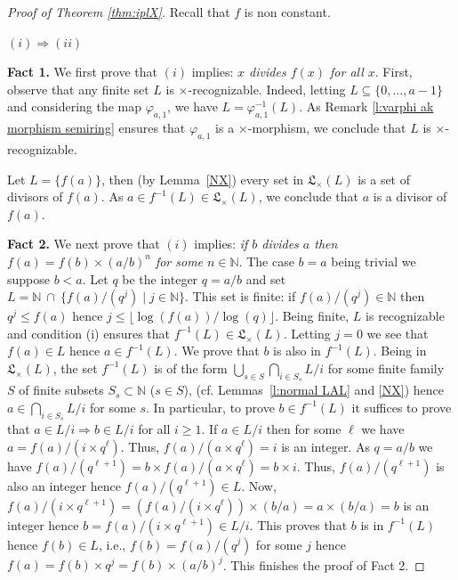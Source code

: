 \documentclass[11pt,a4paper]{article}
\theoremstyle{definition} %
\newcommand\+[1]{\mathcal{#1}} %
\newcommand{\N}{{\mathbb N}}     %
\newcommand{\Latt}{{\mathfrak{L}}}
\begin{document}
%
\begin{proof} [Proof of Theorem \ref{thm:iplX}] Recall that  $f$ is non constant.

$(i)\Longrightarrow (ii)$ 

{\bf Fact 1.} We first prove that $(i)$ implies:  {\em $x$ divides $f(x)$ for all $x$}.  
First, observe that any finite set $L$ is $\times$-recognizable.
Indeed, letting $L\subseteq\{0,\ldots,a-1\}$ and considering the map $\varphi_{a,1}$,
we have $L=\varphi_{a,1}^{-1}(L)$. As Remark \ref{l:varphi ak morphism semiring} ensures that 
$\varphi_{a,1}$ is a $\times$-morphism, we conclude that $L$ is $\times$-recognizable. 

Let $L=\{f(a)\}$, then (by Lemma~\ref{NX}) every set in $\Latt_\times(L)$ is a set of divisors of $f(a)$. As $a\in f^{-1}(L)\in \Latt_\times(L)$, we conclude that $a$ is a divisor of $f(a)$.

\smallskip

{\bf Fact 2.} We next prove that $(i)$ implies:
{\em if $b$ divides $a$ then $f(a)=f(b)\times(a/b)^n$ for some $n\in\N$}. 
The case $b=a$ being trivial we suppose $b<a$.
Let $q$ be the integer $q=a/b$ and set $L=\N\ \cap\ \{f(a)/( q^j)\mid j\in\N\}$.
This set is finite: if $f(a)/( q^j)\in\N$ then $q^j\leq f(a)$ hence $j\leq\lfloor\log(f(a))/\log(q)\rfloor$.
Being finite, $L$ is recognizable
and condition (i) ensures that $f^{-1}(L) \in \Latt_\times(L)$.
Letting $j=0$ we see that $f(a)\in L$ hence $a\in f^{-1}(L)$.
We prove that $b$ is also in $f^{-1}(L)$.
Being in $\Latt_\times(L)$, the set $f^{-1}(L)$ is of the form $\bigcup_{s\in S}\bigcap_{i\in S_s}L/i$
for some finite family $S$ of finite subsets $S_s\subset\N$ ($s\in S$),
(cf.\! Lemmas~\ref{l:normal LAL}  and \ref{NX})
hence $a\in\bigcap_{i\in S_s}L/i$ for some $s$.
In particular, to prove $b\in f^{-1}(L)$ it suffices to prove that
$a\in L/i\Rightarrow b\in L/i$ for all $i\geq1$. 
If $a\in L/i$ then for some $\ell$ we have $a=f(a)/(i\times q^\ell)$.
Thus, $f(a)/(a\times q^\ell)=i$ is an integer. 
As $q=a/b$ we have $f(a)/(q^{\ell+1}) = b \times f(a)/(a\times q^\ell) = b\times i$.
Thus, $f(a)/(q^{\ell+1})$ is also an integer hence $f(a)/(q^{\ell+1}) \in L$.
Now, $f(a)/(i\times q^{\ell+1}) = (f(a)/(i\times q^\ell))\times (b/a) = a\times(b/a) = b$ is an integer
hence $b=f(a)/(i\times q^{\ell+1})\in L/i$. 
This proves that $b$ is in $f^{-1}(L)$ hence $f(b)\in L$, i.e., $f(b)=f(a)/(q^j)$ for some $j$
hence $f(a)=f(b) \times q^j = f(b)\times(a/b)^j$.
This finishes the proof of Fact 2.



\end{proof}
\end{document}
